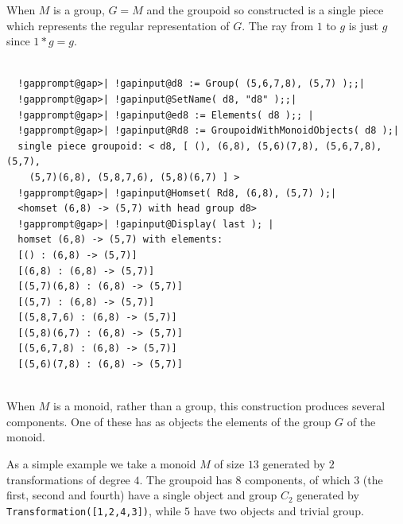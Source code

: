 \documentclass[a4paper,11pt]{report}
\begin{document}
{{{ When $M$ is a group, $G=M$ and the groupoid so constructed is a single piece which represents the regular
representation of $G$. The ray from $1$ to $g$ is just $g$ since $1*g=g$. 

 }

 
\begin{Verbatim}[commandchars=!@|,fontsize=\small,frame=single,label=Example]
  
  !gapprompt@gap>| !gapinput@d8 := Group( (5,6,7,8), (5,7) );;|
  !gapprompt@gap>| !gapinput@SetName( d8, "d8" );;|
  !gapprompt@gap>| !gapinput@ed8 := Elements( d8 );; |
  !gapprompt@gap>| !gapinput@Rd8 := GroupoidWithMonoidObjects( d8 );|
  single piece groupoid: < d8, [ (), (6,8), (5,6)(7,8), (5,6,7,8), (5,7), 
    (5,7)(6,8), (5,8,7,6), (5,8)(6,7) ] >
  !gapprompt@gap>| !gapinput@Homset( Rd8, (6,8), (5,7) );|
  <homset (6,8) -> (5,7) with head group d8>
  !gapprompt@gap>| !gapinput@Display( last ); |
  homset (6,8) -> (5,7) with elements:
  [() : (6,8) -> (5,7)]
  [(6,8) : (6,8) -> (5,7)]
  [(5,7)(6,8) : (6,8) -> (5,7)]
  [(5,7) : (6,8) -> (5,7)]
  [(5,8,7,6) : (6,8) -> (5,7)]
  [(5,8)(6,7) : (6,8) -> (5,7)]
  [(5,6,7,8) : (6,8) -> (5,7)]
  [(5,6)(7,8) : (6,8) -> (5,7)]
  
\end{Verbatim}
 When $M$ is a monoid, rather than a group, this construction produces several
components. One of these has as objects the elements of the group $G$ of the monoid. 

 As a simple example we take a monoid $M$ of size $13$ generated by $2$ transformations of degree $4$. The groupoid has $8$ components, of which $3$ (the first, second and fourth) have a single object and group $C_2$ generated by \texttt{Transformation([1,2,4,3])}, while $5$ have two objects and trivial group. 

 
\begin{Verbatim}[commandchars=!@|,fontsize=\small,frame=single,label=Example]
  

\end{Verbatim}}}
\end{document}
